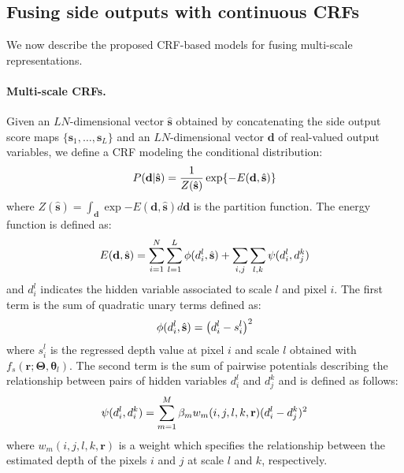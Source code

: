 \documentclass[10pt,twocolumn,letterpaper]{article}
\newcommand{\vect}[1]{\mathbf{#1}}
\begin{document}
\subsection{Fusing side outputs with continuous CRFs}
We now describe the proposed CRF-based models for fusing multi-scale representations. \vspace{-3mm}
\paragraph{Multi-scale CRFs.} 
\label{sec:HCRF}
Given an $LN$-dimensional vector $\hat{\mathbf{s}}$ obtained by concatenating the side output 
{score maps} $\{\vect{s}_{1},\dots,\vect{s}_{L}\}$ and 
an $LN$-dimensional vector $\vect{d}$ of real-valued output variables, 
we define a CRF modeling the conditional distribution:
\begin{equation}
\setlength{\abovedisplayskip}{2pt}
\setlength{\belowdisplayskip}{2pt}
  P(\vect{d}|\hat{\mathbf{s}}) = \frac{1}{Z(\hat{\mathbf{s}})} \exp \{-E(\vect{d},\hat{\mathbf{s}})\}
\end{equation}
where $Z(\hat{\mathbf{s}})=\int_{\vect{d}} \exp {-E(\vect{d},\hat{\mathbf{s}})} {d\vect{d}}$ is the partition function.
The energy function is defined as:
\begin{equation}
\setlength{\abovedisplayskip}{2pt}
\setlength{\belowdisplayskip}{2pt}
E(\vect{d}, \hat{\mathbf{s}})  =  \sum_{i=1}^{N} \sum_{l=1}^{L} \phi(d_i^l, \hat{\mathbf{s}}) + \sum_{i, j} \sum_{l, k} 
 \psi(d_i^l, d_j^k)  \label{energy}\end{equation}
and $d_i^l$ indicates the hidden variable associated to scale $l$ and pixel $i$.
The first term is the sum of quadratic unary terms defined as:
\begin{equation}
\setlength{\abovedisplayskip}{2pt}
\setlength{\belowdisplayskip}{2pt}
\phi(d_i^l, \hat{\mathbf{s}}) = \big (d_i^l - s_i^l \big )^2
\end{equation}
where $s^l_i$ is the regressed depth value at pixel $i$ and scale $l$ obtained with $f_s(\vect{r}; \mathbf{\Theta}, \boldsymbol{\theta}_{l})$.
The second term is the sum of pairwise potentials describing the relationship 
between pairs of hidden variables $d_i^l$ and $d_j^k$ and is defined as follows:
\begin{equation}
\setlength{\abovedisplayskip}{2pt}
\setlength{\belowdisplayskip}{2pt}
\psi(d_i^l, d_i^k) =  \sum_{m=1}^{M} \beta_m w_m(i,j,l,k,\vect{r})(d_i^l-d_j^k)^2
\end{equation}
where $w_m(i,j,l,k,\vect{r})$ is a weight which specifies the relationship between the estimated depth
of the pixels $i$ and $j$ at scale $l$ and $k$, respectively.
\end{document}
